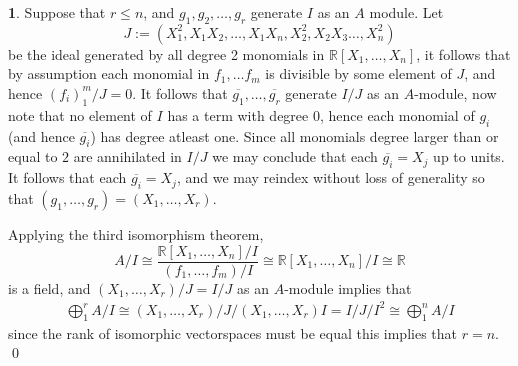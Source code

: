 \documentclass[11pt]{article}
\theoremstyle{definition}
\newtheorem{pb}{}
\begin{document}
    \begin{pb}
        Suppose that \(r \leq n\), and \(g_1,g_2,\hdots,g_r\) generate \(I\) as an \(A\) module. Let \[J := (X_1^2,X_1X_2,\hdots,X_1X_n,X_2^2,X_2X_3 \hdots, X_n^2)\]
        be the ideal generated by all degree 2 monomials in \(\mathbb{R}[X_1,\hdots,X_n]\), it follows that by assumption each monomial in \(f_1,\hdots f_m\) is divisible by some element of \(J\), and hence \((f_i)_1^m/J = 0\).
        It follows that \(\overline{g_1},\hdots,\overline{g_r}\) generate \(I/J\) as an \(A\)-module, now note that no element of \(I\) has a term with degree \(0\), hence each monomial of \(g_i\) (and hence \(\overline{g_i}\)) has degree atleast one. Since all monomials degree larger than or equal to \(2\) are annihilated in \(I/J\) we may conclude that each \(\overline{g_i} = X_j\) up to units. It follows that each \(\overline{g_i} = X_j\), and we may reindex without loss of generality so that \((g_1,\hdots,g_r) = (X_1,\hdots,X_r)\).

        Applying the third isomorphism theorem, \[A/I \cong \frac{\mathbb{R}[X_1,\hdots,X_n]/I}{(f_1,\hdots,f_m)/I} \cong \mathbb{R}[X_1,\hdots,X_n]/I \cong \mathbb{R}\] is a field, and \((X_1,\hdots,X_r)/J = I/J\) as an \(A\)-module implies that
        \begin{align*}
            \bigoplus_1^r A/I \cong (X_1,\hdots,X_r)/J/(X_1,\hdots,X_r)I = I/J/I^2 \cong \bigoplus_1^n A/I
        \end{align*}
        since the rank of isomorphic vectorspaces must be equal this implies that \(r = n\). \qed
    \end{pb}
\end{document}
